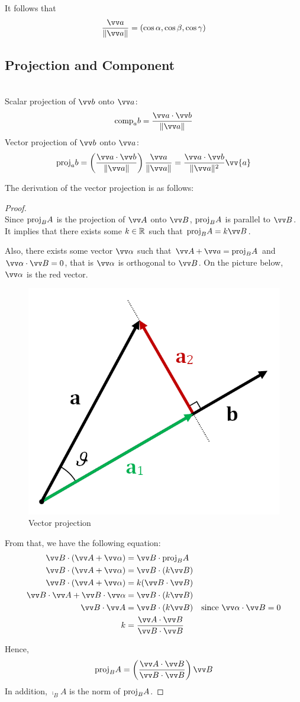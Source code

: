 It follows that
$$
\frac{\vv a}{\norm{\vv a}} = (\cos\alpha,\cos\beta,\cos\gamma)
$$

\subsection{Projection and Component}

\begin{definition}
\hfill \\
Scalar projection of $\vv b$ onto $\vv a$:
$$
\comp_a b = \frac{\vv a \cdot \vv b}{\norm{\vv a}}
$$
Vector projection of $\vv b$ onto $\vv a$:
$$
\proj_a b = \left(\frac{\vv a \cdot \vv b}{\norm{\vv a}}\right)\frac{\vv a}{\norm{\vv a}} = \frac{\vv a \cdot \vv b}{\norm{\vv a}^2}\vv{a}
$$
\end{definition}

The derivation of the vector projection is as follows:

\begin{proof}
\hfill \\
Since ${\mathrm{proj}}_{B}{A}$ is the projection of $\vv A$ onto $\vv B$, ${\mathrm{proj}}_{B}{A}$ is parallel to $\vv B$. It implies that there exists some $k \in {\mathbb R}$ such that $\proj_B{A}=k{\vv B}$.

Also, there exists some vector $\vv\alpha$ such that $\vv A + \vv a = \proj_B A$ and $\vv\alpha \cdot \vv B = 0$, that is $\vv\alpha$ is orthogonal to $\vv B$. On the picture below, $\vv\alpha$ is the red vector.

\begin{figure}[h]
    \centering
    \includegraphics[width=0.3\linewidth]{figures/projection.png}
    \caption{Vector projection}
    \label{fig:projection}
\end{figure}

From that, we have the following equation:
\begin{align*}
    \vv B \cdot (\vv A + \vv \alpha) &= \vv B \cdot \proj_B A \\
    \vv B \cdot (\vv A + \vv \alpha) &= \vv B \cdot (k \vv B) \\
    \vv B \cdot (\vv A + \vv \alpha) &= k (\vv B \cdot \vv B) \\
    \vv B \cdot \vv A + \vv B \cdot \vv \alpha &= \vv B \cdot (k \vv B) \\
    \vv B \cdot \vv A &= \vv B \cdot (k \vv B) & \text{since $\vv\alpha \cdot \vv B = 0$} \\
    k &= \frac{\vv A \cdot \vv B}{\vv B \cdot \vv B}
\end{align*}

Hence,
$$
\proj_B A = \left( \frac{\vv A \cdot \vv B}{\vv B \cdot \vv B} \right) \vv B
$$
In addition, $\comp_B A$ is the norm of ${\mathrm{proj}}_B A$.
\end{proof}

